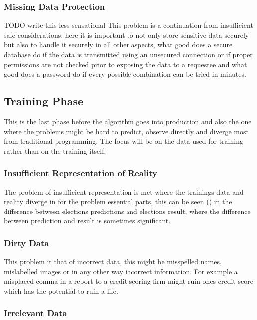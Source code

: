 \subsubsection{Missing Data Protection}

{ \color{red} TODO write this less sensational }
This problem is a continuation from insufficient safe considerations, here it is important to not only store sensitive data securely but also to handle it securely in all other aspects, what good does a secure database do if the data is transmitted using an unsecured connection or if 
proper permissions are not checked prior to exposing the data to a requestee and what good does a password do if every possible combination can be tried in minutes.

\subsection{Training Phase}
This is the last phase before the algorithm goes into production and also the one where the problems might be hard to predict, observe directly and diverge most from traditional programming. The focus will be on the data used for training rather than on the training itself.

\subsubsection{Insufficient Representation of Reality}

The problem of insufficient representation is met where 
the trainings data and reality diverge in for the problem 
essential parts, this can be seen (\cite{2016}) in the difference between 
elections predictions and elections result, where the difference
between prediction and result is sometimes significant.

\subsubsection{Dirty Data}

This problem it that of incorrect data, this might be misspelled names, mislabelled images or in any other way incorrect information. For example a misplaced comma in a report to a credit scoring firm might ruin ones credit score which has the potential to ruin a life.

\subsubsection{Irrelevant Data}

